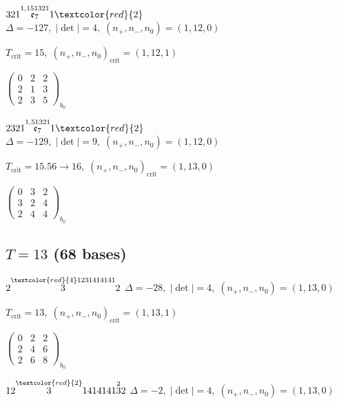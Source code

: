 \documentclass[10pt]{article}
\begin{document}
\smallskip

$321\overset{1,151321}{\mathfrak{e}_7}1\textcolor{red}{2}$ \quad $\Delta=-127,\; |\det|=4,\; (n_+,n_-,n_0)=(1,12,0)$

\hspace{1em}$T_{\text{crit}}=15,\; (n_+,n_-,n_0)_{\text{crit}}=(1,12,1)$

\hspace{2em}$\left(\begin{smallmatrix}0 & 2 & 2 \\ 2 & 1 & 3 \\ 2 & 3 & 5\end{smallmatrix}\right)_{\!b_0}$

\smallskip

$2321\overset{1,51321}{\mathfrak{e}_7}1\textcolor{red}{2}$ \quad $\Delta=-129,\; |\det|=9,\; (n_+,n_-,n_0)=(1,12,0)$

\hspace{1em}$T_{\text{crit}}=15.56 \to 16,\; (n_+,n_-,n_0)_{\text{crit}}=(1,13,0)$

\hspace{2em}$\left(\begin{smallmatrix}0 & 3 & 2 \\ 3 & 2 & 4 \\ 2 & 4 & 4\end{smallmatrix}\right)_{\!b_0}$


\subsection*{$T = 13$ \quad (68 bases)}
\smallskip

$2\overset{\textcolor{red}{4}1231414141}{3}2$ \quad $\Delta=-28,\; |\det|=4,\; (n_+,n_-,n_0)=(1,13,0)$

\hspace{1em}$T_{\text{crit}}=13,\; (n_+,n_-,n_0)_{\text{crit}}=(1,13,1)$

\hspace{2em}$\left(\begin{smallmatrix}0 & 2 & 2 \\ 2 & 4 & 6 \\ 2 & 6 & 8\end{smallmatrix}\right)_{\!b_0}$

$12\overset{\textcolor{red}{2}}{3}1414141\overset{2}{3}2$ \quad $\Delta=-2,\; |\det|=4,\; (n_+,n_-,n_0)=(1,13,0)$
\end{document}
